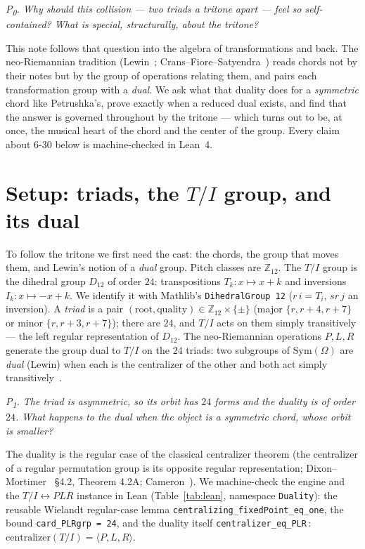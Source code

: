 \documentclass[11pt]{article}
\newcommand{\lean}[1]{\texttt{#1}}
\newcommand{\Ztwelve}{\mathbb{Z}_{12}}
\newcommand{\Dgrp}[1]{D_{#1}}
\newcommand{\question}[1]{\smallskip\noindent\textit{#1}\smallskip}
\begin{document}
\question{P\textsubscript{0}. Why should \emph{this} collision --- two triads a tritone apart --- feel so
self-contained? What is special, structurally, about the tritone?}

This note follows that question into the algebra of transformations and back. The neo-Riemannian
tradition (Lewin~\cite{Lewin}; Crans--Fiore--Satyendra~\cite{CFS}) reads chords not by their notes but by
the group of operations relating them, and pairs each transformation group with a \emph{dual}. We ask
what that duality does for a \emph{symmetric} chord like Petrushka's, prove exactly when a reduced dual
exists, and find that the answer is governed throughout by the tritone --- which turns out to be, at once,
the musical heart of the chord and the center of the group. Every claim about 6-30 below is
machine-checked in Lean~4.

\section{Setup: triads, the $T/I$ group, and its dual}\label{sec:setup}

To follow the tritone we first need the cast: the chords, the group that moves them, and Lewin's notion
of a \emph{dual} group. Pitch classes are $\Ztwelve$. The $T/I$ group is the dihedral group $\Dgrp{12}$ of order $24$:
transpositions $T_k:x\mapsto x+k$ and inversions $I_k:x\mapsto -x+k$. We identify it with Mathlib's
\lean{DihedralGroup 12} ($r\,i = T_i$, $sr\,j$ an inversion). A \emph{triad} is a pair
$(\mathrm{root},\mathrm{quality})\in\Ztwelve\times\{\pm\}$ (major $\{r,r+4,r+7\}$ or minor
$\{r,r+3,r+7\}$); there are $24$, and $T/I$ acts on them simply transitively --- the left regular
representation of $\Dgrp{12}$. The neo-Riemannian operations $P,L,R$ generate the group dual to $T/I$ on
the $24$ triads: two subgroups of $\mathrm{Sym}(\Omega)$ are \emph{dual} (Lewin) when each is the
centralizer of the other and both act simply transitively~\cite{CFS}.

\question{P\textsubscript{1}. The triad is asymmetric, so its orbit has $24$ forms and the duality is of
order $24$. What happens to the dual when the object is a \emph{symmetric} chord, whose orbit is smaller?}

The duality is the regular case of the classical centralizer theorem (the centralizer of a regular
permutation group is its opposite regular representation; Dixon--Mortimer~\cite{DM} \S4.2, Theorem 4.2A;
Cameron~\cite{Cam}). We machine-check the engine and the $T/I\!\leftrightarrow\!PLR$ instance in Lean
(Table~\ref{tab:lean}, namespace \lean{Duality}): the reusable Wielandt regular-case lemma
\lean{centralizing\_fixedPoint\_eq\_one}, the bound \lean{card\_PLRgrp = 24}, and the duality itself
\lean{centralizer\_eq\_PLR}\,: $\mathrm{centralizer}(T/I)=\langle P,L,R\rangle$.
\end{document}
